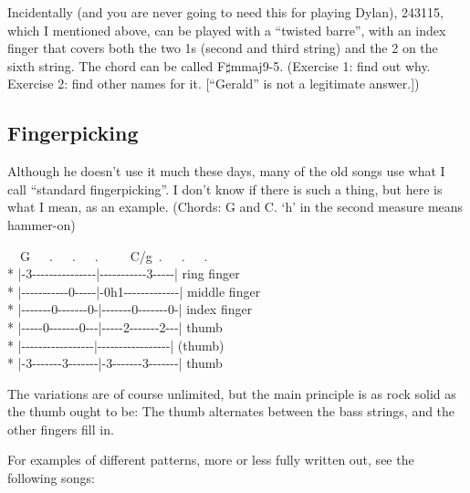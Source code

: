 Incidentally (and you are never going to need this for playing Dylan),
243115, which I mentioned above, can be played with a ``{}twisted barre''{}, with an index
finger that covers both the two 1s (second and third string) and the 2
on the sixth string. The chord can be called
F$\sharp$mmaj9-5. (Exercise 1: find out why. Exercise 2: find other
names for it. [``{}Gerald''{} is not a legitimate answer.])


\subsection*{Fingerpicking}

Although he doesn't use it much these days, many of the old songs use
what I call ``{}standard fingerpicking''{}. I don't know if there is
such a thing, but here is what I mean, as an example. (Chords: G and
C. `{}h'{} in the second measure means hammer-on)

\begin{pre}
\begin{adjustwidth}{2em}{0em}
~~G~~~.~~~.~~~.~~~~~C/g~.~~~.~~~.\\*
|{-}3{-}{-}{-}{-}{-}{-}{-}{-}{-}{-}{-}{-}{-}{-}{-}|{-}{-}{-}{-}{-}{-}{-}{-}{-}{-}{-}3{-}{-}{-}{-}{-}| ring finger\\*
|{-}{-}{-}{-}{-}{-}{-}{-}{-}{-}{-}0{-}{-}{-}{-}{-}|{-}0h1{-}{-}{-}{-}{-}{-}{-}{-}{-}{-}{-}{-}{-}| middle finger\\*
|{-}{-}{-}{-}{-}{-}{-}0{-}{-}{-}{-}{-}{-}{-}0{-}|{-}{-}{-}{-}{-}{-}{-}0{-}{-}{-}{-}{-}{-}{-}0{-}| index finger\\*
|{-}{-}{-}{-}{-}0{-}{-}{-}{-}{-}{-}{-}0{-}{-}{-}|{-}{-}{-}{-}{-}2{-}{-}{-}{-}{-}{-}{-}2{-}{-}{-}| thumb\\*
|{-}{-}{-}{-}{-}{-}{-}{-}{-}{-}{-}{-}{-}{-}{-}{-}{-}|{-}{-}{-}{-}{-}{-}{-}{-}{-}{-}{-}{-}{-}{-}{-}{-}{-}| (thumb)\\*
|{-}3{-}{-}{-}{-}{-}{-}{-}3{-}{-}{-}{-}{-}{-}{-}|{-}3{-}{-}{-}{-}{-}{-}{-}3{-}{-}{-}{-}{-}{-}{-}| thumb
\end{adjustwidth}
\end{pre}

The variations are of course unlimited, but the main principle is as
rock solid as the thumb ought to be: The thumb alternates between the
bass strings, and the other fingers fill in.

For examples of different patterns, more or less fully written out,
see the following songs:

